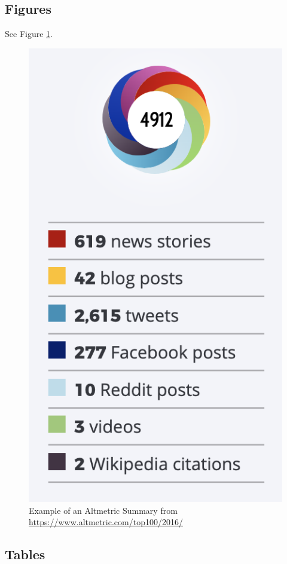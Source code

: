 \documentclass{article}
\begin{document}
\subsection{Figures}

See Figure \ref{fig:altmetric}.

\begin{figure} %
    \centering
    \includegraphics{altmetric.png}
    \caption{Example of an Altmetric Summary from \url{https://www.altmetric.com/top100/2016/}}
    \label{fig:altmetric}
\end{figure}

\subsection{Tables}
\end{document}
